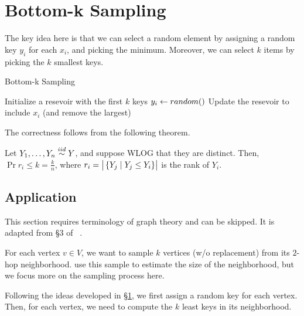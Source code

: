 \documentclass{article}
\begin{document}
\section{Bottom-k Sampling}
\label{sec:bottomk}

The key idea here is that we can select a random element by assigning a random key $y_i$ for each $x_i$, and picking the minimum.
Moreover, we can select $k$ items by picking the $k$ smallest keys.

\begin{algorithm}
    \caption{Bottom-k Sampling}
    \begin{algorithmic}[1]
            \State Initialize a resevoir with the first $k$ keys
                \State $y_i \gets \mathop{random}()$
                    \State Update the resevoir to include $x_i$ (and remove the largest)
                \EndIf
            \EndFor
        \EndFunction
    \end{algorithmic}
    \label{alg:bottomk}
\end{algorithm}

The correctness follows from the following theorem.
\begin{theorem}
    \label{thm:rank}
    Let $Y_1, \ldots, Y_n \overset{iid}{\sim} Y$, and suppose WLOG that they are distinct.
    Then, $\Pr{r_i \le k} = \frac{k}{n}$, where $r_i = \left| \bigr. \left\{ Y_j \mid Y_j \le Y_i \right\} \right|$ is the rank of $Y_i$.
\end{theorem}

\subsection{Application}
\label{sec:reach}

This section requires terminology of graph theory and can be skipped.
It is adapted from \S3 of ~\cite{cohen97-12}.

For each vertex $v \in V$, we want to sample $k$ vertices (w/o replacement) from its $2$-hop neighborhood.
\cite{cohen97-12} use this sample to estimate the size of the neighborhood, but we focus more on the sampling process here.

Following the ideas developed in \S\ref{sec:bottomk}, we first assign a random key for each vertex.
Then, for each vertex, we need to compute the $k$ least keys in its neighborhood.
\end{document}
